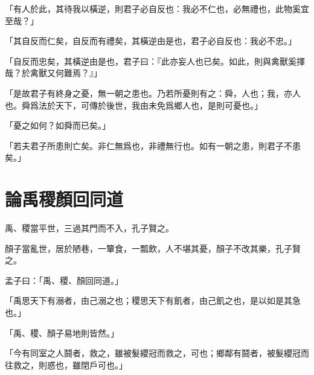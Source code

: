 「有人於此，其待我以橫逆，則君子必自反也：我必不仁也，必無禮也，此物奚宜至哉？」

「其自反而仁矣，自反而有禮矣，其橫逆由是也，君子必自反也：我必不忠。」

「自反而忠矣，其橫逆由是也，君子曰：『此亦妄人也已矣。如此，則與禽獸奚擇哉？於禽獸又何難焉？』」

「是故君子有終身之憂，無一朝之患也。乃若所憂則有之：舜，人也；我，亦人也。舜爲法於天下，可傳於後世，我由未免爲鄉人也，是則可憂也。」

「憂之如何？如舜而已矣。」

「若夫君子所患則亡矣。非仁無爲也，非禮無行也。如有一朝之患，則君子不患矣。」\par {}

\section{論禹稷顏回同道}

禹、稷當平世，三過其門而不入，孔子賢之。

顏子當亂世，居於陋巷，一簞食，一瓢飲，人不堪其憂，顏子不改其樂，孔子賢之。

孟子曰：「禹、稷、顏回同道。」

「禹思天下有溺者，由己溺之也；稷思天下有飢者，由己飢之也，是以如是其急也。」

「禹、稷、顏子易地則皆然。」

「今有同室之人鬪者，救之，雖被髮纓冠而救之，可也；鄉鄰有鬪者，被髮纓冠而往救之，則惑也，雖閉戶可也。」\par {}

